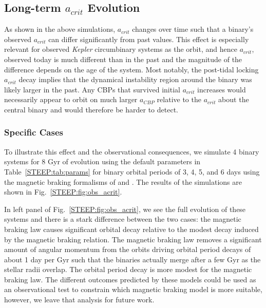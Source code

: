 \subsection{Long-term $a_{crit}$ Evolution} \label{STEEP:sec:obs_acrit}

As shown in the above simulations, $a_{crit}$ changes over time such that a binary's observed $a_{crit}$ can differ significantly from past values.  This effect is especially relevant for observed {\it Kepler} circumbinary systems as the orbit, and hence $a_{crit}$, observed today is much different than in the past and the magnitude of the difference depends on the age of the system.  Most notably, the post-tidal locking $a_{crit}$ decay implies that the dynamical instability region around the binary was likely larger in the past.  Any CBPs that survived initial $a_{crit}$ increases would necessarily appear to orbit on much larger $a_{CBP}$ relative to the $a_{crit}$ about the central binary and would therefore be harder to detect.

\subsubsection{Specific Cases}

To illustrate this effect and the observational consequences, we simulate 4 binary systems for 8 Gyr of evolution using the default parameters in Table~\ref{STEEP:tab:params} for binary orbital periods of 3, 4, 5, and 6 days using the magnetic braking formalisms of \citet{Reiners2012} and \citet{Repetto2014}.  The results of the simulations are shown in Fig.~\ref{STEEP:fig:obs_acrit}.

In left panel of Fig.~\ref{STEEP:fig:obs_acrit}, we see the full evolution of these systems and there is a stark difference between the two cases: the \citet{Reiners2012} magnetic braking law causes significant orbital decay relative to the modest decay induced by the \citet{Repetto2014} magnetic braking relation.  The \citet{Reiners2012} magnetic braking law removes a significant amount of angular momentum from the orbits driving orbital period decays of about 1 day per Gyr such that the binaries actually merge after a few Gyr as the stellar radii overlap.  The orbital period decay is more modest for the \citet{Repetto2014} magnetic braking law.  The different outcomes predicted by these models could be used as an observational test to constrain which magnetic braking model is more suitable, however, we leave that analysis for future work.

